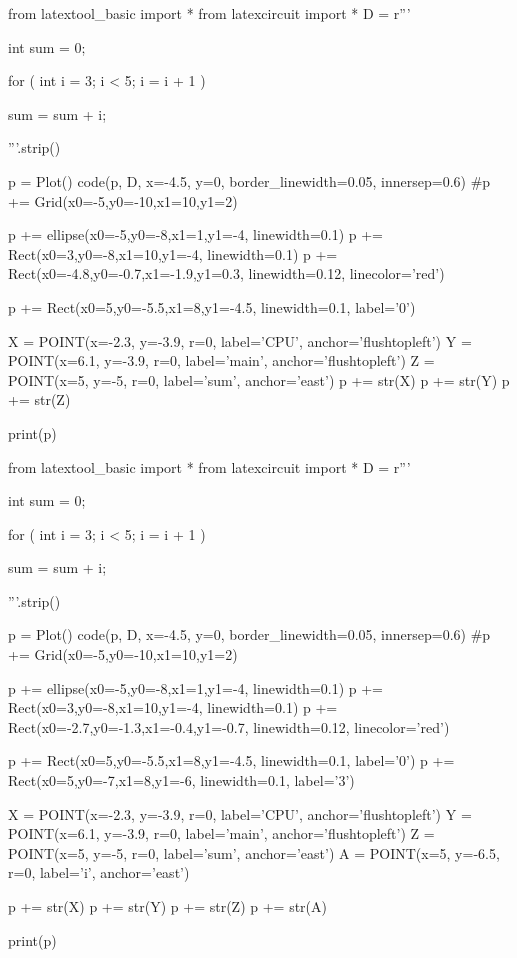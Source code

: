 \begin{python}
from latextool_basic import *
from latexcircuit import *
D = r'''



int sum = 0;

    for ( int i = 3;     i < 5;     i = i + 1 )


        sum = sum + i;



'''.strip()

p = Plot()
code(p, D, x=-4.5, y=0, border_linewidth=0.05, innersep=0.6)
#p += Grid(x0=-5,y0=-10,x1=10,y1=2)

p += ellipse(x0=-5,y0=-8,x1=1,y1=-4, linewidth=0.1)
p += Rect(x0=3,y0=-8,x1=10,y1=-4, linewidth=0.1)
p += Rect(x0=-4.8,y0=-0.7,x1=-1.9,y1=0.3, linewidth=0.12, linecolor='red')

p += Rect(x0=5,y0=-5.5,x1=8,y1=-4.5, linewidth=0.1, label='0')

X = POINT(x=-2.3, y=-3.9, r=0, label='CPU', anchor='flushtopleft')
Y = POINT(x=6.1, y=-3.9, r=0, label='main', anchor='flushtopleft')
Z = POINT(x=5, y=-5, r=0, label='sum', anchor='east')
p += str(X)
p += str(Y)
p += str(Z)

print(p)
\end{python}

\begin{python}
from latextool_basic import *
from latexcircuit import *
D = r'''



int sum = 0;

    for ( int i = 3;     i < 5;     i = i + 1 )


        sum = sum + i;



'''.strip()

p = Plot()
code(p, D, x=-4.5, y=0, border_linewidth=0.05, innersep=0.6)
#p += Grid(x0=-5,y0=-10,x1=10,y1=2)

p += ellipse(x0=-5,y0=-8,x1=1,y1=-4, linewidth=0.1)
p += Rect(x0=3,y0=-8,x1=10,y1=-4, linewidth=0.1)
p += Rect(x0=-2.7,y0=-1.3,x1=-0.4,y1=-0.7, linewidth=0.12, linecolor='red')

p += Rect(x0=5,y0=-5.5,x1=8,y1=-4.5, linewidth=0.1, label='0')
p += Rect(x0=5,y0=-7,x1=8,y1=-6, linewidth=0.1, label='3')

X = POINT(x=-2.3, y=-3.9, r=0, label='CPU', anchor='flushtopleft')
Y = POINT(x=6.1, y=-3.9, r=0, label='main', anchor='flushtopleft')
Z = POINT(x=5, y=-5, r=0, label='sum', anchor='east')
A = POINT(x=5, y=-6.5, r=0, label='i', anchor='east')

p += str(X)
p += str(Y)
p += str(Z)
p += str(A)

print(p)
\end{python}


